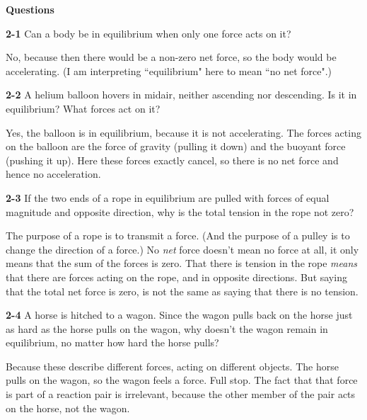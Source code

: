 \documentclass{amsart}
\begin{document}
\textbf{Questions}

\vspace{\baselineskip}

\noindent
\textbf{2-1} Can a body be in equilibrium when only one force acts on it?

No, because then there would be a non-zero net force, so the body would be accelerating.
(I am interpreting ``equilibrium" here to mean ``no net force".)

\vspace{\baselineskip}

\noindent
\textbf{2-2} A helium balloon hovers in midair, neither ascending nor descending.
Is it in equilibrium?
What forces act on it?

Yes, the balloon is in equilibrium, because it is not accelerating.
The forces acting on the balloon are the force of gravity (pulling it down)
and the buoyant force (pushing it up).
Here these forces exactly cancel, so there is no net force and hence no acceleration.

\vspace{\baselineskip}

\noindent
\textbf{2-3} If the two ends of a rope in equilibrium are pulled with forces of equal magnitude
and opposite direction, why is the total tension in the rope not zero?

The purpose of a rope is to transmit a force.
(And the purpose of a pulley is to change the direction of a force.)
No \textit{net} force doesn't mean no force at all, it only means that the sum of the forces is zero.
That there is tension in the rope \textit{means} that there are forces acting on the rope,
and in opposite directions.
But saying that the total net force is zero, is not the same as saying that there is no tension.

\vspace{\baselineskip}

\noindent
\textbf{2-4} A horse is hitched to a wagon.
Since the wagon pulls back on the horse just as hard as the horse pulls on the wagon,
why doesn't the wagon remain in equilibrium, no matter how hard the horse pulls?

Because these describe different forces, acting on different objects.
The horse pulls on the wagon, so the wagon feels a force.  Full stop.
The fact that that force is part of a reaction pair is irrelevant,
because the other member of the pair acts on the horse, not the wagon.

\vspace{\baselineskip}
\end{document}
